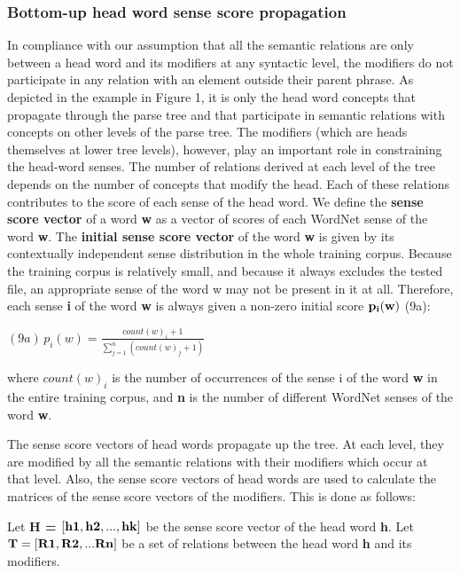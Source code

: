 \subsubsection{Bottom-up head word sense score propagation}
In compliance with our assumption that all the semantic relations are only between a head word and its modifiers at any syntactic level, the modifiers do not participate in any relation with an element outside their parent phrase. As depicted in the example in Figure 1, it is only the head word concepts that propagate through the parse tree and that participate in semantic relations with concepts on other levels of the parse tree. The modifiers (which are heads themselves at lower tree levels), however, play an important role in constraining the head-word senses. The number of relations derived at each level of the tree depends on the number of concepts that modify the head. Each of these relations contributes to the score of each sense of the head word. We define the {\bf sense score vector} of a word {\bf w} as a vector of scores of each WordNet sense of the word {\bf w}. The {\bf initial sense score vector} of the word {\bf w} is given by its contextually independent sense distribution in the whole training corpus. Because the training corpus is relatively small, and because it always excludes the tested file, an appropriate sense of the word w may not be present in it at all. Therefore, each sense {\bf i} of the word {\bf w} is always given a non-zero initial score ${\bf p_{i}(w)}$ (9a):
\begin{center}
  $ (9a) \,  p_{i}(w)=\frac{\displaystyle count(w)_{i}+1}{\displaystyle \sum_{j=1}^{n}(count(w)_{j}+1)} $
\end{center}
where {\it $count(w)_{i}$} is the number of occurrences of the sense i of the word {\bf w} in the entire training corpus, and {\bf n} is the number of different WordNet senses of the word {\bf w}. 

The sense score vectors of head words propagate up the tree. At each level, they are modified by all the semantic relations with their modifiers which occur at that level. Also, the sense score vectors of head words are used to calculate the matrices of the sense score vectors of the modifiers. This is done as follows:

Let {\bf H = ${\bf [h1,h2,...,hk]}$} be the sense score vector of the head word {\bf h}. Let ${\bf T = [R1,R2,...Rn]}$ be a set of relations between the head word {\bf h} and its modifiers.


